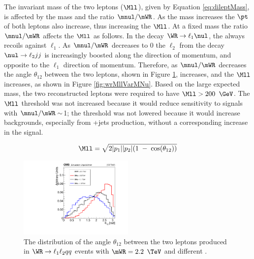 The invariant mass of the two leptons ($\Mll$), given by Equation \ref{eq:dileptMass}, is affected by the \WR mass and the ratio $\mnul/\mWR$.  
As the \WR mass increases the $\pt$ of both leptons also increase, thus increasing the $\Mll$.  At a fixed \WR mass the ratio $\mnul/\mWR$ 
affects the $\Mll$ as follows.  In the decay $\WR \rightarrow \ell_{1}\nul$, the \nul always recoils against $\ell_{1}$.  As $\mnul/\mWR$ 
decreases to 0 the $\ell_{2}$ from the decay $\nul \rightarrow \ell_{2} jj$ is increasingly boosted along the \nul direction of momentum, 
and opposite to the $\ell_{1}$ direction of momentum.  Therefore, as $\mnul/\mWR$ decreases the angle $\theta_{12}$ between the two leptons, 
shown in Figure \ref{fig:wrLeptAngleSepVarMNu}, increases, and the $\Mll$ increases, as shown in Figure \ref{fig:wrMllVarMNu}.  Based on 
the large expected \WR mass, the two reconstructed leptons were required to have $\Mll > 200$ $\GeV$.  The $\Mll$ threshold was not increased 
because it would reduce sensitivity to \WR signals with $\mnul/\mWR \sim$1; the threshold was not lowered because it would increase 
backgrounds, especially from \DY+jets production, without a corresponding increase in the signal.

\begin{equation}
	\Mll = \sqrt{2|p_{1}||p_{2}|(1\thickspace - \thickspace \cos(\theta_{12}))}
	\label{eq:dileptMass}
\end{equation}

\begin{figure}[h]
	\centering
	\includegraphics[width=0.5\textwidth]{figures/angleBtwnGenLepts_MWR_2200_several_MNu_private.pdf}
	\caption{The distribution of the angle $\theta_{12}$ between the two leptons produced in $\WR \rightarrow \ell_{1}\ell_{2} qq$ events with 
		$\mWR = 2.2$ $\TeV$ and different \mnul.}
	\label{fig:wrLeptAngleSepVarMNu}
\end{figure}

